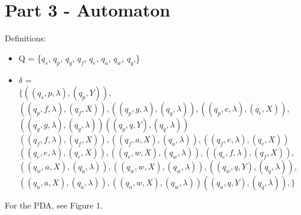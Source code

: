 \documentclass{article}
\begin{document}
\section{Part 3 - Automaton}
Definitions: 
\begin{center}
    \begin{itemize}
        \item Q = \{$q_s$, $q_p$, $q_g$, $q_f$, $q_e$, $q_a$, $q_w$, $q_q$,\}
        \item $\delta$ =\\ $\{
        ((q_s,p, \lambda), (q_p,Y)),$\\
        $((q_p,f, \lambda), (q_f,X)),
        ((q_p,g, \lambda), (q_g,\lambda)),
        ((q_p,e, \lambda), (q_e,X)),$\\
        $((q_g, g, \lambda), (q_g, \lambda))
        ((q_g, q, Y), (q_q, \lambda))$\\
        $((q_f,f, \lambda), (q_f,X)),
        ((q_f,a, X), (q_a,\lambda)),
        ((q_f,e, \lambda), (q_e,X))$\\
        $((q_e,e, \lambda), (q_e,X)),
        ((q_e,w, X), (q_w,\lambda)),
        ((q_e,f, \lambda), (q_f,X)),$\\
        $((q_w,a, X), (q_a,\lambda)),
        ((q_w,w, X), (q_w,\lambda)),
        ((q_w,q, Y), (q_q,\lambda)),$\\
        $((q_a,a, X), (q_a,\lambda)),
        ((q_a,w, X), (q_w,\lambda))
        ((q_a,q, Y), (q_q,\lambda)),
        \}$
    \end{itemize}
\end{center}
For the PDA, see Figure 1.
\end{document}
